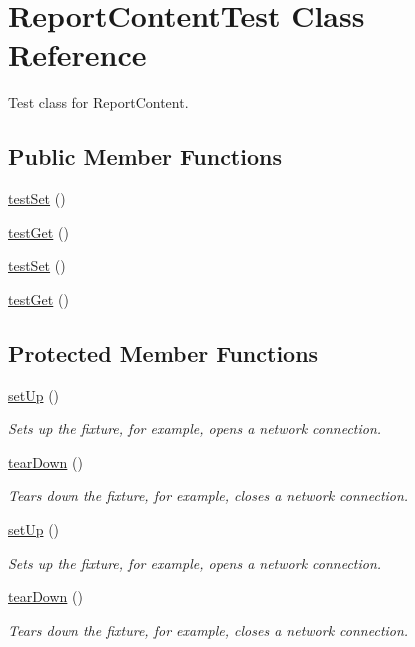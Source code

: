 \hypertarget{class_report_content_test}{
\section{ReportContentTest Class Reference}
\label{class_report_content_test}
}


Test class for ReportContent.  


\subsection*{Public Member Functions}
\begin{DoxyCompactItemize}
\item 
\hyperlink{class_report_content_test_a2db3318b9dccd3da3930d973c822a782}{testSet} ()
\item 
\hyperlink{class_report_content_test_ace4b8181b43e3a0e281c4d3112f28ba9}{testGet} ()
\item 
\hyperlink{class_report_content_test_a2db3318b9dccd3da3930d973c822a782}{testSet} ()
\item 
\hyperlink{class_report_content_test_ace4b8181b43e3a0e281c4d3112f28ba9}{testGet} ()
\end{DoxyCompactItemize}
\subsection*{Protected Member Functions}
\begin{DoxyCompactItemize}
\item 
\hyperlink{class_report_content_test_ae5c5f0d70ef4c07580b114b60959dccc}{setUp} ()
\begin{DoxyCompactList}\small\item\em Sets up the fixture, for example, opens a network connection. \item\end{DoxyCompactList}\item 
\hyperlink{class_report_content_test_a8e2d56acc0c97be2ed026794ea635468}{tearDown} ()
\begin{DoxyCompactList}\small\item\em Tears down the fixture, for example, closes a network connection. \item\end{DoxyCompactList}\item 
\hyperlink{class_report_content_test_ae5c5f0d70ef4c07580b114b60959dccc}{setUp} ()
\begin{DoxyCompactList}\small\item\em Sets up the fixture, for example, opens a network connection. \item\end{DoxyCompactList}\item 
\hyperlink{class_report_content_test_a8e2d56acc0c97be2ed026794ea635468}{tearDown} ()
\begin{DoxyCompactList}\small\item\em Tears down the fixture, for example, closes a network connection. \item\end{DoxyCompactList}\end{DoxyCompactItemize}
